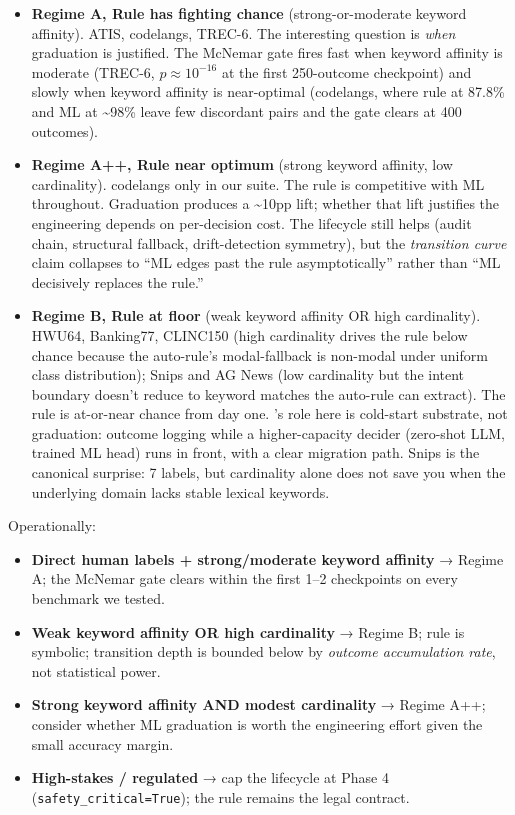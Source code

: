 \begin{itemize}
\tightlist
\item
  \textbf{Regime A, Rule has fighting chance} (strong-or-moderate
  keyword affinity). ATIS, codelangs, TREC-6. The interesting question
  is \emph{when} graduation is justified. The McNemar gate fires fast
  when keyword affinity is moderate (TREC-6, \(p \approx 10^{-16}\) at
  the first 250-outcome checkpoint) and slowly when keyword affinity is
  near-optimal (codelangs, where rule at 87.8\% and ML at
  \textasciitilde98\% leave few discordant pairs and the gate clears at
  400 outcomes).
\item
  \textbf{Regime A++, Rule near optimum} (strong keyword affinity, low
  cardinality). codelangs only in our suite. The rule is competitive
  with ML throughout. Graduation produces a \textasciitilde10pp lift;
  whether that lift justifies the engineering depends on per-decision
  cost. The lifecycle still helps (audit chain, structural fallback,
  drift-detection symmetry), but the \emph{transition curve} claim
  collapses to ``ML edges past the rule asymptotically'' rather than
  ``ML decisively replaces the rule.''
\item
  \textbf{Regime B, Rule at floor} (weak keyword affinity OR high
  cardinality). HWU64, Banking77, CLINC150 (high cardinality drives the
  rule below chance because the auto-rule's modal-fallback is non-modal
  under uniform class distribution); Snips and AG News (low cardinality
  but the intent boundary doesn't reduce to keyword matches the
  auto-rule can extract). The rule is at-or-near chance from day one.
  \sysname{}'s role here is cold-start substrate, not graduation: outcome
  logging while a higher-capacity decider (zero-shot LLM, trained ML
  head) runs in front, with a clear migration path. Snips is the
  canonical surprise: 7 labels, but cardinality alone does not save you
  when the underlying domain lacks stable lexical keywords.
\end{itemize}

Operationally:

\begin{itemize}
\tightlist
\item
  \textbf{Direct human labels + strong/moderate keyword affinity} →
  Regime A; the McNemar gate clears within the first 1--2 checkpoints on
  every benchmark we tested.
\item
  \textbf{Weak keyword affinity OR high cardinality} → Regime B; rule is
  symbolic; transition depth is bounded below by \emph{outcome
  accumulation rate}, not statistical power.
\item
  \textbf{Strong keyword affinity AND modest cardinality} → Regime A++;
  consider whether ML graduation is worth the engineering effort given
  the small accuracy margin.
\item
  \textbf{High-stakes / regulated} → cap the lifecycle at Phase 4
  (\texttt{safety\_critical=True}); the rule remains the legal contract.
\end{itemize}

